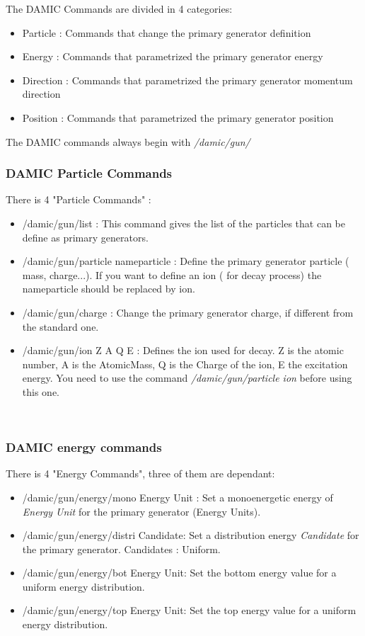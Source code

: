 \documentclass[français,final,twoside,12pt]{article}
\begin{document}
The DAMIC  Commands are divided in 4 categories:
\begin{itemize}
\item Particle  : Commands that change the primary generator definition
\item Energy  : Commands that parametrized the primary generator energy
\item Direction : Commands that parametrized the primary generator momentum direction
\item Position : Commands that parametrized the primary generator position
\newline
\end{itemize}

The DAMIC commands always begin with \textit{/damic/gun/}

\subsubsection{DAMIC Particle Commands}

There is 4 "Particle Commands" : 
\\
\begin{itemize}
\item /damic/gun/list : This command gives the list of the particles that can be define as primary generators. 
\item /damic/gun/particle nameparticle : Define the primary generator particle ( mass, charge...). If you want to define an ion ( for decay process) the nameparticle should be replaced by ion.
\item /damic/gun/charge :  Change the primary generator charge, if different from the standard one.
\item /damic/gun/ion Z A Q E : Defines the ion used for decay. Z is the atomic number, A is the AtomicMass, Q is the Charge of the ion, E the excitation energy. You need to use the command \textit{/damic/gun/particle ion} before using this one. 
\end{itemize}
\\

\subsubsection{DAMIC energy commands}
There is 4 "Energy Commands", three of them are dependant:\\

\begin{itemize}
\item /damic/gun/energy/mono Energy Unit : Set a monoenergetic energy of \textit{Energy Unit} for the primary generator (Energy Units).
\item /damic/gun/energy/distri Candidate:  Set a distribution energy \textit{Candidate} for the primary generator. Candidates : Uniform.
\item /damic/gun/energy/bot Energy Unit: Set the bottom energy value for a uniform energy distribution. 
\item /damic/gun/energy/top Energy Unit: Set the top energy value for a uniform energy distribution.
\end{itemize}
\\
\end{document}
